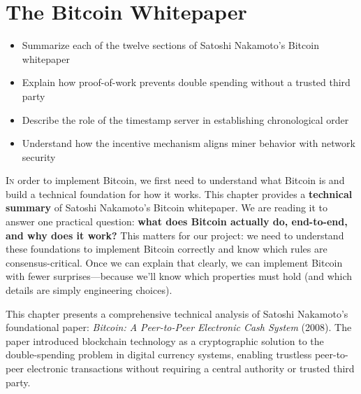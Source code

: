 \chapter{The Bitcoin Whitepaper}
\label{ch:whitepaper}

\begin{learnbox}
\begin{itemize}
  \item Summarize each of the twelve sections of Satoshi Nakamoto's Bitcoin whitepaper
  \item Explain how proof-of-work prevents double spending without a trusted third party
  \item Describe the role of the timestamp server in establishing chronological order
  \item Understand how the incentive mechanism aligns miner behavior with network security
\end{itemize}
\end{learnbox}

\lettrine{I}{n} order to implement Bitcoin, we first need to understand what Bitcoin is and build a technical foundation for how it works. This chapter provides a \textbf{technical summary} of Satoshi Nakamoto's Bitcoin whitepaper. We are reading it to answer one practical question: \textbf{what does Bitcoin actually do, end-to-end, and why does it work?} This matters for our project: we need to understand these foundations to implement Bitcoin correctly and know which rules are consensus-critical. Once we can explain that clearly, we can implement Bitcoin with fewer surprises---because we'll know which properties must hold (and which details are simply engineering choices).

This chapter presents a comprehensive technical analysis of Satoshi Nakamoto's foundational paper: \emph{Bitcoin: A Peer-to-Peer Electronic Cash System} (2008). The paper introduced blockchain technology as a cryptographic solution to the double-spending problem in digital currency systems, enabling trustless peer-to-peer electronic transactions without requiring a central authority or trusted third party.


